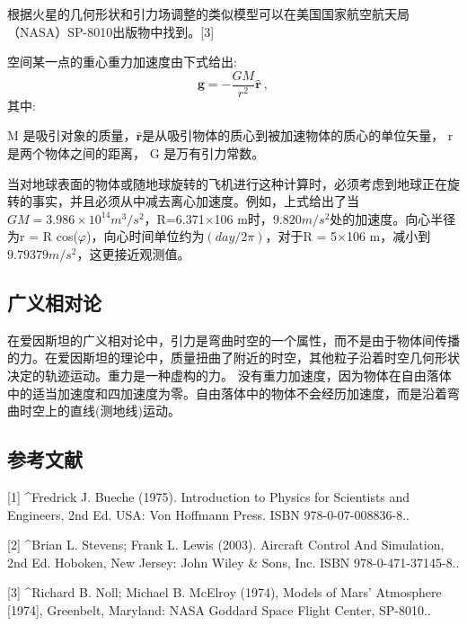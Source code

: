 根据火星的几何形状和引力场调整的类似模型可以在美国国家航空航天局（NASA）SP-8010出版物中找到。[3]

空间某一点的重心重力加速度由下式给出:
$$\mathbf{g} = -\frac{GM}{r^2} \hat{\mathbf{r}}~,$$
其中:

M 是吸引对象的质量，$\hat{\mathbf{r}}$是从吸引物体的质心到被加速物体的质心的单位矢量， r 是两个物体之间的距离， G 是万有引力常数。

当对地球表面的物体或随地球旋转的飞机进行这种计算时，必须考虑到地球正在旋转的事实，并且必须从中减去离心加速度。例如，上式给出了当$GM = 3.986\times10^{14} m^3/s^2$，R=6.371×106 m时，$9.820 m/s^2$处的加速度。向心半径为r = R cos($\varphi$)，向心时间单位约为$(day / 2\pi)$，对于R = 5×106 m，减小到$9.79379 m/s^2$，这更接近观测值。

\subsection{广义相对论}

在爱因斯坦的广义相对论中，引力是弯曲时空的一个属性，而不是由于物体间传播的力。在爱因斯坦的理论中，质量扭曲了附近的时空，其他粒子沿着时空几何形状决定的轨迹运动。重力是一种虚构的力。 没有重力加速度，因为物体在自由落体中的适当加速度和四加速度为零。自由落体中的物体不会经历加速度，而是沿着弯曲时空上的直线(测地线)运动。

\subsection{参考文献}

[1]
^Fredrick J. Bueche (1975). Introduction to Physics for Scientists and Engineers, 2nd Ed. USA: Von Hoffmann Press. ISBN 978-0-07-008836-8..

[2]
^Brian L. Stevens; Frank L. Lewis (2003). Aircraft Control And Simulation, 2nd Ed. Hoboken, New Jersey: John Wiley & Sons, Inc. ISBN 978-0-471-37145-8..

[3]
^Richard B. Noll; Michael B. McElroy (1974), Models of Mars' Atmosphere [1974], Greenbelt, Maryland: NASA Goddard Space Flight Center, SP-8010..